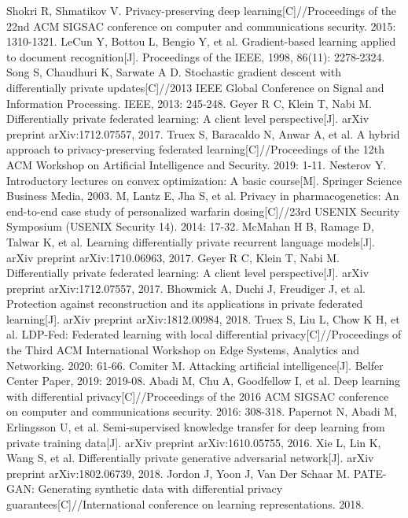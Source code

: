 \documentclass[12pt,openany,a4paper,fancyhdr,oneside]{ctexbook}
\begin{document}
\begin{thebibliography}{99}
Shokri R, Shmatikov V. Privacy-preserving deep learning[C]//Proceedings of the 22nd ACM SIGSAC conference on computer and communications security. 2015: 1310-1321.
LeCun Y, Bottou L, Bengio Y, et al. Gradient-based learning applied to document recognition[J]. Proceedings of the IEEE, 1998, 86(11): 2278-2324.
Song S, Chaudhuri K, Sarwate A D. Stochastic gradient descent with differentially private updates[C]//2013 IEEE Global Conference on Signal and Information Processing. IEEE, 2013: 245-248.
Geyer R C, Klein T, Nabi M. Differentially private federated learning: A client level perspective[J]. arXiv preprint arXiv:1712.07557, 2017.
Truex S, Baracaldo N, Anwar A, et al. A hybrid approach to privacy-preserving federated learning[C]//Proceedings of the 12th ACM Workshop on Artificial Intelligence and Security. 2019: 1-11.
Nesterov Y. Introductory lectures on convex optimization: A basic course[M]. Springer Science Business Media, 2003.
  M, Lantz E, Jha S, et al. Privacy in pharmacogenetics: An end-to-end case study of personalized warfarin dosing[C]//23rd {USENIX} Security Symposium ({USENIX} Security 14). 2014: 17-32.
McMahan H B, Ramage D, Talwar K, et al. Learning differentially private recurrent language models[J]. arXiv preprint arXiv:1710.06963, 2017.
Geyer R C, Klein T, Nabi M. Differentially private federated learning: A client level perspective[J]. arXiv preprint arXiv:1712.07557, 2017.
Bhowmick A, Duchi J, Freudiger J, et al. Protection against reconstruction and its applications in private federated learning[J]. arXiv preprint arXiv:1812.00984, 2018.
Truex S, Liu L, Chow K H, et al. LDP-Fed: Federated learning with local differential privacy[C]//Proceedings of the Third ACM International Workshop on Edge Systems, Analytics and Networking. 2020: 61-66.
Comiter M. Attacking artificial intelligence[J]. Belfer Center Paper, 2019: 2019-08.
Abadi M, Chu A, Goodfellow I, et al. Deep learning with differential privacy[C]//Proceedings of the 2016 ACM SIGSAC conference on computer and communications security. 2016: 308-318.
Papernot N, Abadi M, Erlingsson U, et al. Semi-supervised knowledge transfer for deep learning from private training data[J]. arXiv preprint arXiv:1610.05755, 2016.
Xie L, Lin K, Wang S, et al. Differentially private generative adversarial network[J]. arXiv preprint arXiv:1802.06739, 2018.
Jordon J, Yoon J, Van Der Schaar M. PATE-GAN: Generating synthetic data with differential privacy guarantees[C]//International conference on learning representations. 2018.

\end{thebibliography}
\end{document}
